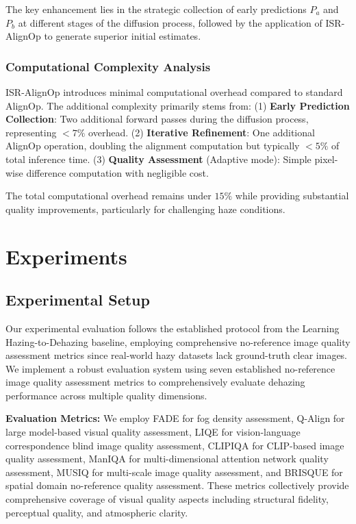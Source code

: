 \documentclass{article}
\begin{document}
The key enhancement lies in the strategic collection of early predictions $P_a$ and $P_b$ at different stages of the diffusion process, followed by the application of ISR-AlignOp to generate superior initial estimates.

\subsubsection{Computational Complexity Analysis}

ISR-AlignOp introduces minimal computational overhead compared to standard AlignOp. The additional complexity primarily stems from: (1) \textbf{Early Prediction Collection}: Two additional forward passes during the diffusion process, representing $< 7\%$ overhead. (2) \textbf{Iterative Refinement}: One additional AlignOp operation, doubling the alignment computation but typically $< 5\%$ of total inference time. (3) \textbf{Quality Assessment} (Adaptive mode): Simple pixel-wise difference computation with negligible cost.

The total computational overhead remains under $15\%$ while providing substantial quality improvements, particularly for challenging haze conditions.

\section{Experiments}

\subsection{Experimental Setup}

Our experimental evaluation follows the established protocol from the Learning Hazing-to-Dehazing baseline, employing comprehensive no-reference image quality assessment metrics since real-world hazy datasets lack ground-truth clear images. We implement a robust evaluation system using seven established no-reference image quality assessment metrics to comprehensively evaluate dehazing performance across multiple quality dimensions.

\noindent\textbf{Evaluation Metrics:}
We employ FADE for fog density assessment, Q-Align for large model-based visual quality assessment, LIQE for vision-language correspondence blind image quality assessment, CLIPIQA for CLIP-based image quality assessment, ManIQA for multi-dimensional attention network quality assessment, MUSIQ for multi-scale image quality assessment, and BRISQUE for spatial domain no-reference quality assessment. These metrics collectively provide comprehensive coverage of visual quality aspects including structural fidelity, perceptual quality, and atmospheric clarity.
\end{document}
